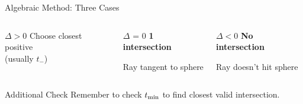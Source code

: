 \begin{frame}{Algebraic Method: Three Cases}
\begin{columns}
\begin{column}{0.33\textwidth}
\begin{conceptbox}{$\Delta > 0$}
                Choose closest positive \\ (usually $t_-$)
            \end{conceptbox}
        \end{column}
        \begin{column}{0.33\textwidth}
            \begin{conceptbox}{$\Delta \text{ = } 0$}
                \textbf{1 intersection}
                \begin{center}
                \end{center}                
                Ray tangent to sphere
                \vspace{0.3cm}
            \end{conceptbox}
        \end{column}
        \begin{column}{0.33\textwidth}
            \begin{conceptbox}{$\Delta < 0$}
                \textbf{No intersection}
                \begin{center}                    
                \end{center}                
                Ray doesn't hit sphere
                \vspace{0.5cm}
            \end{conceptbox}
        \end{column}
    \end{columns}
    
    \vspace{0.5cm}
    \begin{mathbox}{Additional Check}
        Remember to check $t_{\text{\text{min}}}$ to find closest valid intersection.
    \end{mathbox}
\end{frame}


